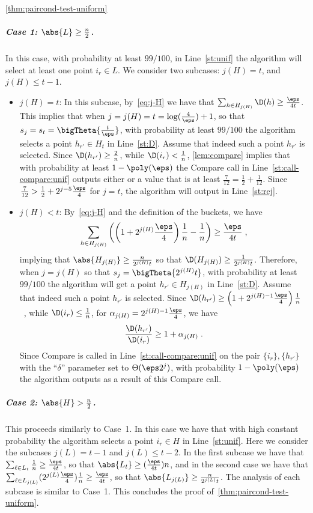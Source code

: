 \begin{proofof}{\cref{thm:paircond-test-uniform}}
\smallskip\subparagraph{Case 1: $\abs{L} \geq \frac{n}{2}$.}
In this case, with probability at least $99/100$,
in Line~\ref{st:unif} the algorithm will select at least one point $i_r \in L$.
We consider two subcases: $j(H) = t$, and $j(H) \leq t-1$.
\begin{itemize}
  \item $j(H)=t$:  In this subcase, by~\cref{eq:j-H} we have that
$\sum_{h\in H_{j(H)}} \D(h) \geq \frac{\eps}{4t}$. This implies that
when $j = j(H) = t = \log(\frac{4}{\eps}) + 1$,
so that $s_j = s_t = \bigTheta{\frac{t}{\eps}}$, with
probability at least $99/100$ the algorithm selects
 a point $h_{r'} \in H_t$ in Line~\ref{st:D}.
Assume that indeed such a point $h_{r'}$ is selected.
Since $\D(h_{r'}) \geq \frac{2}{n}$,
while $\D(i_{r}) < \frac{1}{n}$,
\cref{lem:compare} implies that with probability at least
$1 - \poly(\eps)$ the {\sc Compare} call in Line~\ref{st:call-compare:unif}
outputs either \high or a value that is at least $
{\frac 7 {12}} = {\frac{1}2} + {\frac{1}{12}}.$
Since ${\frac 7 {12}} > {\frac{1}2} + 2^{j-5} {\frac{\eps}4}$ for
$j=t$, the algorithm will output \reject in Line~\ref{st:rej}.

\item $j(H) < t$:  By~\cref{eq:j-H} and the definition of the
buckets, we have
\[ \sum_{h\in H_{j(H)}} \left(\left(1+2^{j(H)}
\frac{\eps}{4}\right)\frac{1}{n} - \frac{1}{n}\right) \geq \frac{\eps}{4t}\;,
\]
implying that
$\abs{ H_{j(H)}} \geq \frac{n}{2^{j(H)} t}$ so that $\D(H_{j(H)})
\geq \frac{1}{2^{j(H)} t}$. Therefore, when $j = j(H)$ so that \mbox{$s_j =
\bigTheta{2^{j(H)} t}$}, with probability at least $99/100$
the algorithm will
get a point $h_{r'} \in H_{j(H)}$ in Line~\ref{st:D}.
Assume that indeed such a point $h_{r'}$ is selected.
Since \mbox{$\D(h_{r'}) \geq \left(1 + 2^{j(H)-1}\frac{\eps}{4}\right)
\frac{1}{n}$ }, while $\D(i_{r}) \leq \frac{1}{n}$, for $\alpha_{j(H)}
= 2^{j(H)-1}\frac{\eps}{4}$, we have
\[
  \frac{\D(h_{r'})}{\D(i_{r})} \geq 1 +\alpha_{j(H)}\;.
\]
Since {\sc Compare} is called in Line~\ref{st:call-compare:unif}
on the pair $\{i_r\},\{h_{r'}\}$
with the ``$\delta$'' parameter set to $\Theta(\eps 2^j)$,
with probability $1 - \poly(\eps)$ the algorithm outputs \reject
as a result of this {\sc Compare} call.

\end{itemize}

\subparagraph{Case 2: $\abs{H} > \frac{n}{2}$.}  This proceeds similarly to Case~1.
In this case we have that with high constant probability the algorithm
selects a point $i_r \in H$ in Line~\ref{st:unif}.
Here we consider the subcases $j(L) = t-1$ and $j(L) \leq t-2$.
In the first subcase we have that
$\sum_{\ell \in L_t} \frac{1}{n} \geq \frac{\eps}{4t}$, so that $\abs{ L_t} \geq (\frac{\eps}{4t})n$,
and in the second case we have that
$\sum_{\ell \in L_{j(L)}} (2^{j(L)}\frac{\eps}{4})\frac{1}{n} \geq \frac{\eps}{4t}$,
so that $\abs{ L_{j(L)}} \geq \frac{n}{2^{j(L)} t}$.
The analysis of each subcase is similar to Case~1. This concludes the proof of~\cref{thm:paircond-test-uniform}.
\end{proofof}


